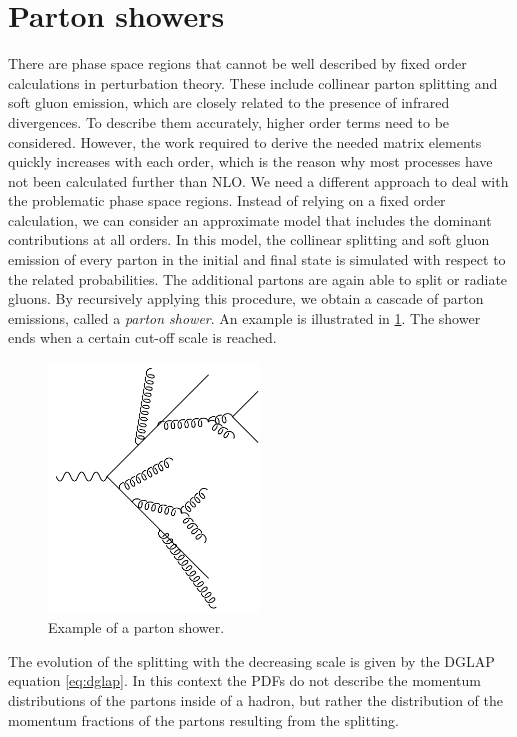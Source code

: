\section{Parton showers}
There are phase space regions that cannot be well described by fixed order calculations in perturbation theory.
These include collinear parton splitting and soft gluon emission, which are closely related to the presence of infrared divergences.
To describe them accurately, higher order terms need to be considered.
However, the work required to derive the needed matrix elements quickly increases with each order, which is the reason why most processes have not been calculated further than NLO.
We need a different approach to deal with the problematic phase space regions.
Instead of relying on a fixed order calculation, we can consider an approximate model that includes the dominant contributions at all orders.
In this model, the collinear splitting and soft gluon emission of every parton in the initial and final state is simulated with respect to the related probabilities.
The additional partons are again able to split or radiate gluons.
By recursively applying this procedure, we obtain a cascade of parton emissions, called a \textit{parton shower}.
An example is illustrated in \cref{fig:partonshower}.
The shower ends when a certain cut-off scale is reached.
%
\begin{figure}[]
	\includegraphics[width=0.5\textwidth]{images/partonshower.pdf}
	\caption{Example of a parton shower.}
	\label{fig:partonshower}
\end{figure}
%

The evolution of the splitting with the decreasing scale is given by the DGLAP equation \cref{eq:dglap}.
In this context the PDFs do not describe the momentum distributions of the partons inside of a hadron, but rather the distribution of the momentum fractions of the partons resulting from the splitting.


